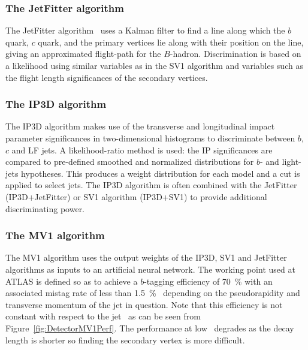 \subsubsection{The JetFitter algorithm}

The JetFitter algorithm~\cite{Detector:TaggingJetFitter} uses a Kalman filter to find a line along which the $b$ quark, $c$ quark, and the primary vertices lie along with their position on the line, giving an approximated flight-path for the $B$-hadron. Discrimination is based on a likelihood using similar variables as in the SV1 algorithm and variables such as the flight length significances of the secondary vertices.

\subsubsection{The IP3D algorithm}

The IP3D algorithm makes use of the transverse and longitudinal impact parameter significances in two-dimensional histograms to discriminate between $b$, $c$ and LF jets. A likelihood-ratio method is used: the IP significances are compared to pre-defined smoothed and normalized distributions for $b$- and light-jets hypotheses. This produces a weight distribution for each model and a cut is applied to select jets. The IP3D algorithm is often combined with the JetFitter (IP3D+JetFitter) or SV1 algorithm (IP3D+SV1) to provide additional discriminating power.

\subsubsection{The MV1 algorithm}

The MV1 algorithm uses the output weights of the IP3D, SV1 and JetFitter algorithms as inputs to an artificial neural network. The working point used at ATLAS is defined so as to achieve a $b$-tagging efficiency of \SI{70}{\percent} with an associated mistag rate of less than \SI{1.5}{\percent}~\cite{DetectorBtaggingMistagMV1} depending on the pseudorapidity and transverse momentum of the jet in question. Note that this efficiency is not constant with respect to the jet \pt\ as can be seen from Figure~\ref{fig:DetectorMV1Perf}. The performance at low \pt\ degrades as the decay length is shorter so finding the secondary vertex is more difficult.

